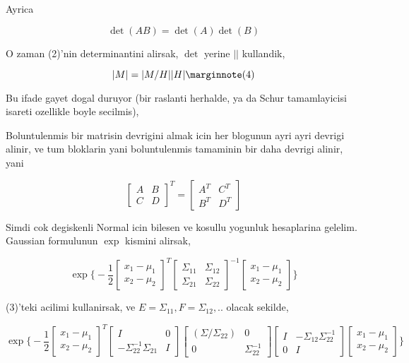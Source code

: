 \documentclass[12pt,fleqn]{article}\usepackage{../common}
\begin{document}
Ayrica 

\[ \det(AB) = \det(A)\det(B) \]

O zaman (2)'nin determinantini alirsak, $\det$ yerine $||$ kullandik, 

\[ |M| = |M/H||H| 
\mlabel{4}
\]

Bu ifade gayet dogal duruyor (bir raslanti herhalde, ya da Schur tamamlayicisi 
isareti ozellikle boyle secilmis),

Boluntulenmis bir matrisin devrigini almak icin her blogunun ayri ayri devrigi
alinir, ve tum bloklarin yani boluntulenmis tamaminin bir daha devrigi
alinir, yani

\[ 
\left[\begin{array}{rr}
A & B \\ C & D 
\end{array}\right]^T = 
\left[\begin{array}{rr}
A^T & C^T \\ B^T & D^T
\end{array}\right]
 \]

Simdi cok degiskenli Normal icin bilesen ve kosullu yogunluk hesaplarina
gelelim. Gaussian formulunun $\exp$ kismini alirsak, 

\[ \exp 
\bigg\{ 
-\frac{ 1}{2}
\left[\begin{array}{r}
x_1 - \mu_1\\
x_2 - \mu_2
\end{array}\right]^T
\left[\begin{array}{rr}
\Sigma_{11} & \Sigma_{12}\\
\Sigma_{21} & \Sigma_{22}
\end{array}\right]^{-1}
\left[\begin{array}{r}
x_1 - \mu_1\\
x_2 - \mu_2
\end{array}\right]
\bigg\}
 \]


(3)'teki acilimi kullanirsak, ve $E = \Sigma_{11},F=\Sigma_{12},..$ olacak sekilde,

\[ \exp 
\bigg\{ 
-\frac{ 1}{2}
\left[\begin{array}{r}
x_1 - \mu_1\\
x_2 - \mu_2
\end{array}\right]^T
\left[\begin{array}{rr}
I & 0 \\ 
-\Sigma_{22}^{-1}\Sigma_{21} & I
\end{array}\right]
\left[\begin{array}{rr}
(\Sigma/\Sigma_{22}) & 0 \\ 
0 & \Sigma_{22}^{-1} 
\end{array}\right]
\left[\begin{array}{rr}
I & -\Sigma_{12}\Sigma_{22}^{-1}  \\ 
0 & I
\end{array}\right]
\left[\begin{array}{r}
x_1 - \mu_1\\
x_2 - \mu_2
\end{array}\right]
\bigg\}
 \]
\end{document}
